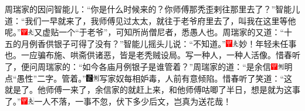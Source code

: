 周瑞家的因问智能儿：``你是什么时候来的？你师傅那秃歪剌往那里去了？''智能儿道：``我们一早就来了，我师傅见过太太，就往于老爷府里去了，叫我在这里等他呢。''{\includegraphics[width=3mm]{../Images/00002}\includegraphics[width=3mm]{../Images/00012}\footnotesize \kaishu 又虚贴一个``于老爷''，可知所尚僧尼者，悉愚人也。}周瑞家的又道：``十五的月例香供银子可得了没有？''智能儿摇头儿说：``不知道。''{\includegraphics[width=3mm]{../Images/00002}\includegraphics[width=3mm]{../Images/00012}\footnotesize \kaishu 妙！年轻未任事也。一应骗布施、哄斋供诸恶，皆是老秃贼设局。写一种人，一种人活像。}惜春听了，便问周瑞家的：``如今各庙月例银子是谁管着？''周瑞家的道：``是余信{\includegraphics[width=3mm]{../Images/00002}\includegraphics[width=3mm]{../Images/00011}\footnotesize \kaishu 明点``愚性''二字。}管着。''{\includegraphics[width=3mm]{../Images/00006}\includegraphics[width=3mm]{../Images/00011}\footnotesize \kaishu 写家奴每相妒毒，人前有意倾陷。}惜春听了笑道：``这就是了。他师傅一来了，余信家的就赶上来，和他师傅咕唧了半日，想是就为这事了。''{\includegraphics[width=3mm]{../Images/00002}\includegraphics[width=3mm]{../Images/00012}\footnotesize \kaishu 一人不落，一事不忽，伏下多少后文，岂真为送花哉！}

